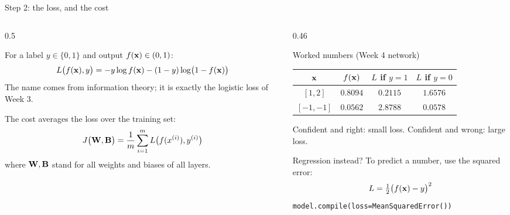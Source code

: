 \documentclass[aspectratio=169,10pt]{beamer}
\begin{document}
\begin{frame}{Step 2: the loss, and the cost}
  \begin{columns}[T,onlytextwidth]
    \begin{column}{0.5\textwidth}
      \begin{defnbox}
        \small
        For a label $y\in\{0,1\}$ and output $f(\mathbf{x})\in(0,1)$:
        \[ L\bigl(f(\mathbf{x}),y\bigr) = -y\log f(\mathbf{x})-(1-y)\log\bigl(1-f(\mathbf{x})\bigr) \]
        The name comes from information theory; it is exactly the logistic loss of Week 3.
      \end{defnbox}
      \footnotesize
      The cost averages the loss over the training set:
      \[ J\bigl(\mathbf{W},\mathbf{B}\bigr)=\frac1m\sum_{i=1}^{m}L\bigl(f(x^{(i)}),y^{(i)}\bigr) \]
      where $\mathbf{W},\mathbf{B}$ stand for all weights and biases of all layers.
    \end{column}
    \begin{column}{0.46\textwidth}
      \footnotesize
      \begin{block}{Worked numbers (Week 4 network)}
        \renewcommand{\arraystretch}{1.15}
        \begin{tabular}{@{}cccc@{}}
          \toprule
          $\mathbf{x}$ & $f(\mathbf{x})$ & $L$ if $y=1$ & $L$ if $y=0$\\
          \midrule
          $[1,2]$   & $0.8094$ & $0.2115$ & $1.6576$\\
          $[-1,-1]$ & $0.0562$ & $2.8788$ & $0.0578$\\
          \bottomrule
        \end{tabular}\par
        \vspace{1mm}
        Confident and right: small loss. Confident and wrong: large loss.
      \end{block}
      \begin{block}{Regression instead?}
        To predict a number, use the squared error:
        \[ L=\tfrac12\bigl(f(\mathbf{x})-y\bigr)^2 \]
        \texttt{model.compile(loss=MeanSquaredError())}
      \end{block}
    \end{column}
  \end{columns}
\end{frame}
\end{document}
